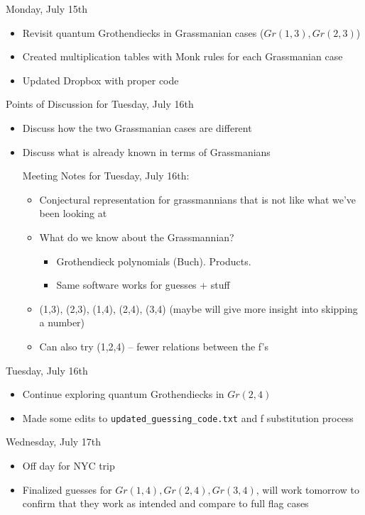Monday, July 15th
\begin{itemize}
    \item Revisit quantum Grothendiecks in Grassmanian cases ($Gr(1, 3), Gr(2, 3)$)
    \item Created multiplication tables with Monk rules for each Grassmanian case
    \item Updated Dropbox with proper code
\end{itemize}

Points of Discussion for Tuesday, July 16th
\begin{itemize}
    \item Discuss how the two Grassmanian cases are different
    \item Discuss what is already known in terms of Grassmanians

Meeting Notes for Tuesday, July 16th:
\begin{itemize}
    \item Conjectural representation for grassmannians that is not like what we've been looking at
    \item What do we know about the Grassmannian?
    \begin{itemize}
        \item Grothendieck polynomials (Buch). Products. 
        \item Same software works for guesses + stuff
    \end{itemize}
    \item (1,3), (2,3), (1,4), (2,4), (3,4) (maybe will give more insight into skipping a number)
    \item Can also try (1,2,4) -- fewer relations between the f's
\end{itemize}
\end{itemize}

Tuesday, July 16th
\begin{itemize}
    \item Continue exploring quantum Grothendiecks in $Gr(2, 4)$
    \item Made some edits to \texttt{updated\_guessing\_code.txt} and f substitution process
\end{itemize}

Wednesday, July 17th
\begin{itemize}
    \item Off day for NYC trip
    \item Finalized guesses for $Gr(1, 4), Gr(2, 4), Gr(3, 4)$, will work tomorrow to confirm that they work as intended and compare to full flag cases
\end{itemize}